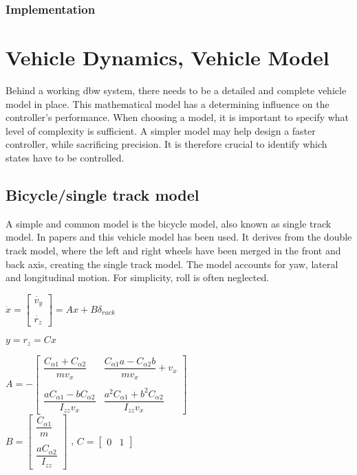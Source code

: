 \documentclass[conference]{IEEEtran}
\begin{document}
\subsubsection{Implementation}


\section{Vehicle Dynamics, Vehicle Model}

Behind a working dbw system, there needs to be a detailed and complete vehicle model in place. This mathematical model has a determining influence on the controller's performance. When choosing a model, it is important to specify what level of complexity is sufficient. A simpler model may help design a faster controller, while sacrificing precision. It is therefore crucial to identify which states have to be controlled.

\subsection{Bicycle/single track model}
A simple and common model is the bicycle model, also known as single track model. In papers \cite{Zheng} and \cite{vandersande} this vehicle model has been used. It derives from the double track model, where the left and right wheels have been merged in the front and back axis, creating the single track model. The model accounts for yaw, lateral and longitudinal motion. For simplicity, roll is often neglected.

$
\dot{x}=
\begin{bmatrix}
	\dot{v_{y}} \\ 
	
\\	\dot{r_{z}}
\end{bmatrix} 
=Ax+B\delta_{rack}
$

$y=r_{z}=Cx$

$
A=-
\begin{bmatrix}
\dfrac{C_{\alpha1}+C_{\alpha2}}{mv_{x}} &
\dfrac{C_{\alpha1}a-C_{\alpha2}b}{mv_{x}}+v_{x}\\
\\
\dfrac{aC_{\alpha1}-bC_{\alpha2}}{I_{zz} v_{x}} &
\dfrac{a^2C_{\alpha1}+b^2C_{\alpha2}}{I_{zz}v_{x}}
\end{bmatrix}
$
\\


$B=
\begin{bmatrix}
\dfrac{C_{\alpha1}}{m}\\
\\
\dfrac{aC_{\alpha2}}{I_{zz}}
\end{bmatrix}
$
,
$C=
\begin{bmatrix}
0 & 1
\end{bmatrix}
$
\end{document}
